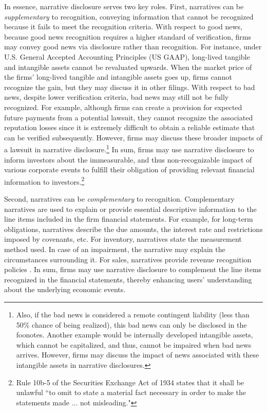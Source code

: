 \documentclass[letterpaper,12pt]{article}
\begin{document}
\begin{spacing}{1.5}
In essence, narrative disclosure serves two key roles. First, narratives can be \textit{supplementary} to recognition, conveying information that cannot be recognized because it fails to meet the recognition criteria. With respect to good news, because good news recognition requires a higher standard of verification, firms may convey good news via disclosure rather than recognition. For instance, under U.S. General Accepted Accounting Principles (US GAAP), long-lived tangible and intangible assets cannot be revaluated upwards. When the market price of the firms' long-lived tangible and intangible assets goes up, firms cannot recognize the gain, but they may discuss it in other filings. With respect to bad news, despite lower verification criteria, bad news may still not be fully recognized. For example, although firms can create a provision for expected future payments from a potential lawsuit, they cannot recognize the associated reputation losses since it is extremely difficult to obtain a reliable estimate that can be verified subsequently. However, firms may discuss these broader impacts of a lawsuit in narrative disclosure.\footnote{Also, if the bad news is considered a remote contingent liability (less than 50\% chance of being realized), this bad news can only be disclosed in the foonotes. Another example would be internally developed intangible assets, which cannot be capitalized, and thus, cannot be impaired when bad news arrives. However, firms may discuss the impact of news associated with these intangible assets in narrative disclosures.} In sum, firms may use narrative disclosure to inform investors about the immeasurable, and thus non-recognizable impact of various corporate events to fulfill their obligation of providing relevant financial information to investors.\footnote{Rule 10b-5 of the Securities Exchange Act of 1934 states that it shall be unlawful ``to omit to state a material fact necessary in order to make the statements made ... not misleading."}

Second, narratives can be \textit{complementary} to recognition. Complementary narratives are used to explain or provide essential descriptive information to the line items included in the firm financial statements. For example, for long-term obligations, narratives describe the due amounts, the interest rate and restrictions imposed by covenants, etc. For inventory, narratives state the measurement method used. In case of an impairment, the narrative may explain the circumstances surrounding it. For sales, narratives provide revenue recognition policies \cite[footnote 4, CON5-7]{fasbStatementFinancialAccounting1984}. In sum, firms may use narrative disclosure to complement the line items recognized in the financial statements, thereby enhancing users' understanding about the underlying economic events.


\end{spacing}
\end{document}
